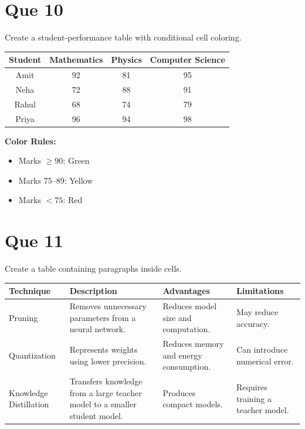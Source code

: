 \documentclass[12pt,a4paper]{article}
\begin{document}
	\section*{Que 10}
	
	Create a student-performance table with conditional cell coloring.
	
	\begin{center}
		\begin{tabular}{|c|c|c|c|}
			\hline
			\rowcolor{headerblue}
			\color{white}\textbf{Student} &
			\color{white}\textbf{Mathematics} &
			\color{white}\textbf{Physics} &
			\color{white}\textbf{Computer Science}\\
			\hline
			Amit & \cellcolor{greenmark}92 & \cellcolor{yellowmark}81 & \cellcolor{greenmark}95\\
			\hline
			Neha & \cellcolor{redmark}72 & \cellcolor{yellowmark}88 & \cellcolor{greenmark}91\\
			\hline
			Rahul & \cellcolor{redmark}68 & \cellcolor{redmark}74 & \cellcolor{yellowmark}79\\
			\hline
			Priya & \cellcolor{greenmark}96 & \cellcolor{greenmark}94 & \cellcolor{greenmark}98\\
			\hline
		\end{tabular}
	\end{center}
	
	\textbf{Color Rules:}
	
	\begin{itemize}
		\item Marks $\geq 90$: Green
		\item Marks 75--89: Yellow
		\item Marks $<75$: Red
	\end{itemize}
	
	\section*{Que 11}
	
	Create a table containing paragraphs inside cells.
	
	\begin{center}
		\small
		\renewcommand{\arraystretch}{1.5}
		\begin{tabular}{|p{2.4cm}|p{4cm}|p{4cm}|p{4cm}|}
			\hline
			\textbf{Technique} &
			\textbf{Description} &
			\textbf{Advantages} &
			\textbf{Limitations}\\
			\hline
			Pruning &
			Removes unnecessary parameters from a neural network. &
			Reduces model size and computation. &
			May reduce accuracy.\\
			\hline
			Quantization &
			Represents weights using lower precision. &
			Reduces memory and energy consumption. &
			Can introduce numerical error.\\
			\hline
			Knowledge Distillation &
			Transfers knowledge from a large teacher model to a smaller student model. &
			Produces compact models. &
			Requires training a teacher model.\\
			\hline
		\end{tabular}
	\end{center}
	
\end{document}
